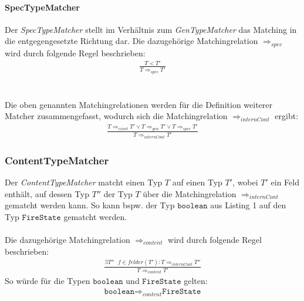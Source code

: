 \paragraph{SpecTypeMatcher}
Der \emph{SpecTypeMatcher} stellt im Verhältnis zum \emph{GenTypeMatcher} das Matching in die entgegengesetzte Richtung dar. Die dazugehörige Matchingrelation $\Rightarrow_{spec}$ wird durch folgende Regel beschrieben: 
\begin{gather*}
\frac{T < T'}{T \Rightarrow_{spec} T'}
\end{gather*}
\\\\
Die oben genannten Matchingrelationen werden für die Definition weiterer Matcher zusammengefasst, wodurch sich die Matchingrelation $\Rightarrow_{internCont}$ ergibt:
\begin{gather*}
\frac{T \Rightarrow_{exact} T' \vee T \Rightarrow_{gen} T' \vee
T \Rightarrow_{spec} T'  }{T \Rightarrow_{internCont} T'}
\end{gather*}
\subsubsection{ContentTypeMatcher}
Der \emph{ContentTypeMatcher} matcht einen Typ $T$ auf einen Typ $T'$, wobei $T'$ ein Feld enthält, auf dessen Typ $T''$ der Typ $T$ über die Matchingrelation $\Rightarrow_{internCont}$ gematcht werden kann. So kann bspw. der Typ $\texttt{boolean}$ aus Listing 1 auf den Typ $\texttt{FireState}$ gematcht werden.
\\\\
Die dazugehörige Matchingrelation $\Rightarrow_{content}$ wird durch folgende Regel beschrieben:
\begin{gather*}
\frac{\exists \mathit{T''\text{ }f}\in felder(T'): T \Rightarrow_{internCont} T''}{T \Rightarrow_{content} T'}
\end{gather*}
\noindent
So würde für die Typen $\texttt{boolean}$ und $\texttt{FireState}$ gelten: 
\begin{gather*}
\texttt{boolean} \Rightarrow_{content} \texttt{FireState}
\end{gather*}
